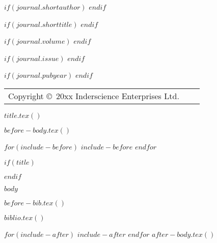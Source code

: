 \def\BottomCatch{%
\vskip -10pt
\thispagestyle{empty}%
\begin{table}[b]%
\NINE\begin{tabular*}{\textwidth}{@{\extracolsep{\fill}}lcr@{}}%
\\[-12pt]
Copyright \copyright\ 20xx Inderscience Enterprises Ltd. & &%
\end{tabular*}%
\vskip -30pt%
\end{table}%
} \makeatother


\setcounter{page}{1}

$if(journal.shortauthor)$
$endif$

$if(journal.shorttitle)$
$endif$

$if(journal.volume)$
$endif$

$if(journal.issue)$
$endif$

$if(journal.pubyear)$
$endif$

\BottomCatch

\CLline

$title.tex()$

$before-body.tex()$

$for(include-before)$
$include-before$
$endfor$

$if(title)$
\maketitle
$endif$

$body$

$before-bib.tex()$

$biblio.tex()$

$for(include-after)$
$include-after$
$endfor$
$after-body.tex()$

